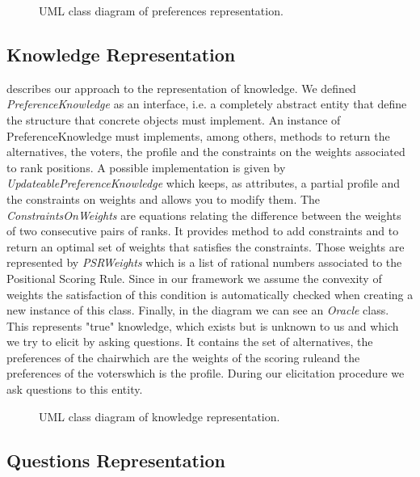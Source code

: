 \begin{sidewaysfigure}
	\centering
	
	\caption{UML class diagram of preferences representation.}
	\label{uml:preference}
\end{sidewaysfigure}

\subsection{Knowledge Representation}

 describes our approach to the representation of knowledge. We defined \textit{PreferenceKnowledge} as an interface, i.e. a completely abstract entity that define the structure that concrete objects must implement. An instance of PreferenceKnowledge must implements, among others, methods to return the alternatives, the voters, the profile and the constraints on the weights associated to rank positions.
A possible implementation is given by \textit{UpdateablePreferenceKnowledge} which keeps, as attributes, a partial profile and the constraints on weights and allows you to modify them. The \textit{ConstraintsOnWeights} are equations relating the difference between the weights of two consecutive pairs of ranks. It provides method to add constraints and to return an optimal set of weights that satisfies the constraints. Those weights are represented by \textit{PSRWeights} which is a list of rational numbers associated to the Positional Scoring Rule. Since in our framework we assume the convexity of weights the satisfaction of this condition is automatically checked when creating a new instance of this class.
Finally, in the diagram we can see an \textit{Oracle} class. This represents "true" knowledge, which exists but is unknown to us and which we try to elicit by asking questions. It contains the set of alternatives, the preferences of the chair\textemdash which are the weights of the scoring rule\textemdash and the preferences of the voters\textemdash which is the profile. During our elicitation procedure we ask questions to this entity.

\begin{sidewaysfigure}
	\centering
	
	\caption{UML class diagram of knowledge representation.}
	\label{uml:knowledge}
\end{sidewaysfigure}

\subsection{Questions Representation}


